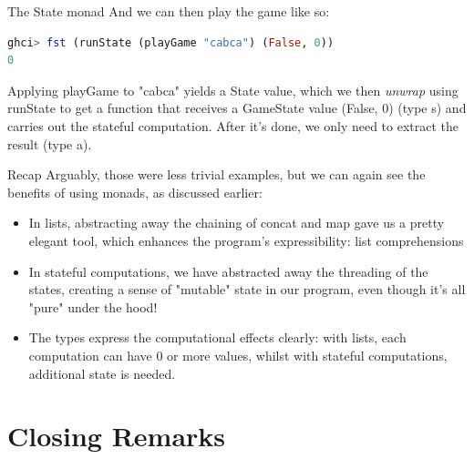 \documentclass{beamer}
\begin{document}
\begin{frame}[fragile]{The State monad}
    And we can then play the game like so:

    \bigbreak
    \begin{minipage}{\linewidth} \hspace{1cm}
    \begin{lstlisting}[language=haskell, numbers=none, frame=none]
ghci> fst (runState (playGame "cabca") (False, 0))
0
    \end{lstlisting}
    \end{minipage} \hspace{1cm}

    \bigbreak
    Applying playGame to "cabca" yields a State value, which we then
    \textit{unwrap} using runState to get a function that receives a
    GameState value (False, 0) (type s) and carries out the stateful
    computation. After it's done, we only need to extract the result
    (type a).
\end{frame}

\begin{frame}[fragile]{Recap}
    Arguably, those were less trivial examples, but we can again see the
    benefits of using monads, as discussed earlier:

    \bigbreak
    \begin{itemize}
        \setlength \itemsep{1em}
        \item In lists, abstracting away the chaining of concat and map
              gave us a pretty elegant tool, which enhances the program's
              expressibility: list comprehensions
        \item In stateful computations, we have abstracted away the
              threading of the states, creating a sense of "mutable"
              state in our program, even though it's all "pure" under
              the hood!
        \item The types express the computational effects clearly: with
              lists, each computation can have 0 or more values, whilst
              with stateful computations, additional state is needed.
    \end{itemize}
\end{frame}

\section{Closing Remarks}
\end{document}
